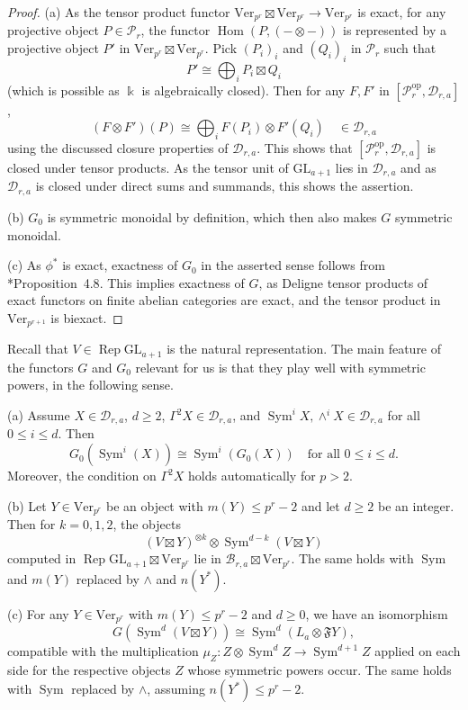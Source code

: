 \documentclass[11pt,oneside]{amsart}
\theoremstyle{definition}
\theoremstyle{remark}
\numberwithin{equation}{section}
\newcommand\op{^{\mathrm{op}}}
\newcommand\cB{\mathcal B}
\newcommand\cD{\mathcal D}
\newcommand\cP{\mathcal P}
\newcommand\Ver{\mathrm{Ver}}
\newcommand\GL{\mathrm{GL}}
\newcommand\Rep{\operatorname{Rep}}
\newcommand\Sym{\operatorname{Sym}}
\renewcommand\o\otimes
\renewcommand\:\colon
\newcommand\kk{\Bbbk}
\newcommand\Hom{\operatorname{Hom}}
\newcommand\Ffrak{\mathfrak F}
\begin{document}
\begin{proof} 
(a) As the tensor product functor $\Ver_{p^r}\boxtimes\Ver_{p^r}\to\Ver_{p^r}$ is exact, for any projective object $P\in\cP_r$, the functor $\Hom(P, (-\otimes-))$ is represented by a projective object $P'$ in $\Ver_{p^r}\boxtimes\Ver_{p^r}$. Pick $(P_i)_i$ and $(Q_i)_i$ in $\cP_r$ such that
$$
P'\cong \bigoplus_i P_i \boxtimes Q_i
$$
(which is possible as $\kk$ is algebraically closed). 
Then for any $F,F'$ in $[\cP_r\op,\cD_{r,a}]$,
$$
(F\o F')(P)\cong \bigoplus_i F(P_i)\o F'(Q_i) \quad \in \cD_{r,a}
$$
using the discussed closure properties of $\cD_{r,a}$. This shows that $[\cP_r\op,\cD_{r,a}]$ is closed under tensor products. As the tensor unit of $\GL_{a+1}$ lies in $\cD_{r,a}$ and as $\cD_{r,a}$ is closed under direct sums and summands, this shows the assertion.

(b) $G_0$ is symmetric monoidal by definition, which then also makes $G$ symmetric monoidal.

(c) As $\phi^*$ is exact, exactness of $G_0$ in the asserted sense follows from \cite{Newton}*{Proposition~4.8}. This implies exactness of $G$, as Deligne tensor products of exact functors on finite abelian categories are exact, and the tensor product in $\Ver_{p^{r+1}}$ is biexact.
\end{proof}

Recall that $V\in\Rep\GL_{a+1}$ is the natural representation. The main feature of the functors $G$ and $G_0$ relevant for us is that they play well with symmetric powers, in the following sense. 

\begin{proposition} \label{prop:G-tensor} \quad
(a) Assume $X\in\cD_{r,a}$, $d\ge2$, $\Gamma^2X\in\cD_{r,a}$, and $\Sym^i X,\wedge^i X\in\cD_{r,a}$ for all $0\le i\le d$. Then
$$
G_0( \Sym^i(X)) \cong \Sym^i (G_0(X)) 
\quad
\text{for all }0\le i\le d.
$$
Moreover, the condition on $\Gamma^2X$ holds automatically for $p>2$.

(b) Let $Y\in\Ver_{p^r}$ be an object with $m(Y)\le p^r-2$ and let $d\ge2$ be an integer. Then for $k=0,1,2$, the objects 
$$
(V\boxtimes Y)^{\o k}\o \Sym^{d-k}(V\boxtimes Y)
$$
computed in $\Rep\GL_{a+1}\boxtimes\Ver_{p^r}$ lie in $\cB_{r,a}\boxtimes\Ver_{p^r}$. The same holds with $\Sym$ and $m(Y)$ replaced by $\wedge$ and $n(Y^*)$.

(c) For any $Y\in\Ver_{p^r}$ with $m(Y)\le p^r-2$ and $d\ge0$, we have an isomorphism
$$
G(\Sym^d(V\boxtimes Y))\cong \Sym^d(L_a\o \Ffrak Y) ,
$$
compatible with the multiplication $\mu_Z\:Z\o\Sym^d Z\to\Sym^{d+1} Z$ applied on each side for the respective objects $Z$ whose symmetric powers occur. The same holds with $\Sym$ replaced by $\wedge$, assuming $n(Y^*)\le p^r-2$.
\end{proposition}
\end{document}
